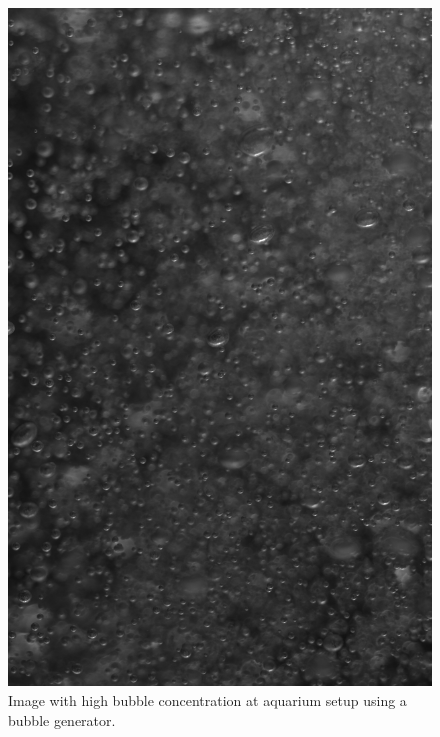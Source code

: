 \begin{figure}
	\centering
	\includegraphics[scale=0.3]{images/aquarium_result_high_conc.jpg}
	\caption{Image with high bubble concentration at aquarium setup using a bubble generator.}
\end{figure}


